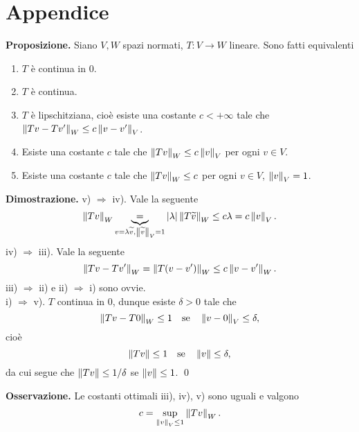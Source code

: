 
\newpage

\section{Appendice}

\textbf{Proposizione.} Siano $V,W$ spazi normati, $T \colon V \to W$ lineare.
Sono fatti equivalenti
\begin{enumerate}
\item $T$ è continua in $0$.

\item $T$ è continua.

\item $T$ è lipschitziana, cioè esiste una costante $c < +\infty$ tale che $\left\lVert Tv - Tv' \right\rVert_W \leq c \left\lVert v - v' \right\rVert_V$.

\item Esiste una costante $c$ tale che $\left\lVert Tv \right\rVert_W \leq c \left\lVert v \right\rVert_V$ per ogni $v \in V$.

\item Esiste una costante $c$ tale che $\left\lVert Tv \right\rVert_W \leq c$ per ogni $v \in V$, $\left\lVert v \right\rVert_V = 1$.
\end{enumerate}

\textbf{Dimostrazione.}
v) $\Rightarrow$ iv). Vale la seguente
%
$$
	\left\lVert Tv \right\rVert_W \underbrace{=}_{v = \lambda \widetilde{v}, \left\lVert \widetilde{v} \right\rVert_V = 1} \left| \lambda \right| \left\lVert T \widetilde{v} \right\rVert_W \leq c \lambda = c \left\lVert v \right\rVert_V.
$$
%
iv) $\Rightarrow$ iii). Vale la seguente
%
$$
	\left\lVert Tv - Tv' \right\rVert_W = \left\lVert T(v - v') \right\rVert_W \leq c \left\lVert v - v' \right\rVert_W.
$$
%
iii) $\Rightarrow$ ii) e ii) $\Rightarrow$ i) sono ovvie. \\
i) $\Rightarrow$ v). $T$ continua in $0$, dunque esiste $\delta > 0$ tale che
%
$$
	\left\lVert Tv - T0 \right\rVert_W \leq 1 \quad \text{se} \quad \left\lVert v - 0 \right\rVert_V \leq \delta,
$$
%
cioè
%
$$
	\left\lVert Tv \right\rVert \leq 1 \quad \text{se} \quad \left\lVert v \right\rVert \leq \delta,
$$
%
da cui segue che $\left\lVert Tv \right\rVert \leq 1/ \delta$ se $\left\lVert v \right\rVert \leq 1$.
\qed

\textbf{Osservazione.} Le costanti ottimali iii), iv), v) sono uguali e valgono
%
$$
c = \sup_{\left\lVert v \right\rVert_V \leq 1} \left\lVert Tv \right\rVert_W.
$$
%

